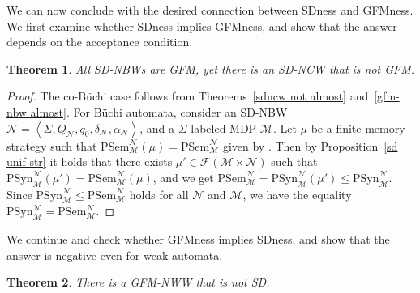 \documentclass[10pt,a4paper]{amsart}
\newtheorem{thm}{Theorem}[section]
\theoremstyle{definition}
\numberwithin{equation}{section}
\newcommand{\buchi}{B\"uchi\xspace}
\newcommand{\M}{{\mathcal M}}
\newcommand{\F}{{\mathcal F}}
\newcommand{\zug}[1]{\left\langle #1 \right\rangle}
\newcommand{\N}{{\mathcal N}}
\begin{document}
We can now conclude with the desired connection between SDness and GFMness. 
We first examine whether SDness implies GFMness, and show that the answer depends on the acceptance condition.

\begin{thm}\label{sd-nbw gfm}
	All SD-NBWs are GFM, yet there is an SD-NCW that is not GFM. 
\end{thm}

\begin{proof}
The co-\buchi case follows from Theorems~\ref{sdncw not almost} and~\ref{gfm-nbw almost}. For \buchi automata, consider an SD-NBW $\N=\zug{\Sigma,Q_\N,q_0,\delta_\N,\alpha_\N}$, and a $\Sigma$-labeled MDP $\M$. Let $\mu$ be a finite memory strategy such that $\mathrm{PSem}^\N_\M(\mu)=\mathrm{PSem}^\N_\M$ given by \cite{CJH03}. Then by Proposition~\ref{sd unif str} it holds that there exists $\mu'\in \F(\M\times \N)$ such that $\mathrm{PSyn}^\N_\M(\mu')=\mathrm{PSem}^\N_\M(\mu)$, and we get $\mathrm{PSem}^\N_\M=\mathrm{PSyn}^\N_\M(\mu')\leq \mathrm{PSyn}^\N_\M$. Since $\mathrm{PSyn}^\N_\M\leq \mathrm{PSem}^\N_\M$ holds for all $\N$ and $\M$, we have the equality $\mathrm{PSyn}^\N_\M= \mathrm{PSem}^\N_\M$.
\end{proof}


We continue and check whether GFMness implies SDness, and show that the answer is negative even for weak automata.

\begin{thm}
	There is a GFM-NWW that is not SD.
\end{thm}
\end{document}
